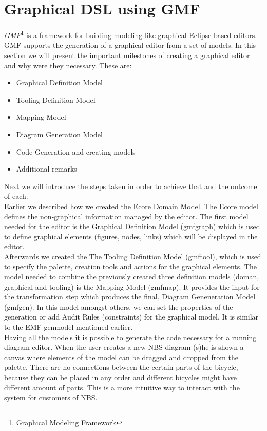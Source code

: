 \section{Graphical DSL using GMF}
\label{sec.gmf}

\noindent \emph{GMF}\footnote{Graphical Modeling Framework} is a framework for
building modeling-like graphical Eclipse-based editors.
\cite{Article_Introducing_GMF} GMF supports the generation of a graphical editor
from a set of models. In this section we will present the important
milestones of creating a graphical editor and why were they necessary. These
are:

\begin{itemize}
  \item Graphical Definition Model
  \item Tooling Definition Model
  \item Mapping Model
  \item Diagram Generation Model
  \item Code Generation and creating models
  \item Additional remarks
\end{itemize}
Next we will introduce the steps taken in order to achieve
that and the outcome of each.\\

\noindent Earlier we described how we created the Ecore Domain Model. The Ecore
model defines the non-graphical information managed by the editor. The first
model needed for the editor is the Graphical Definition Model (gmfgraph) which
is used to define graphical elements (figures, nodes, links)
which will be displayed in the editor. \\

\noindent Afterwards we created the The Tooling Definition Model (gmftool),
which is used to specify the palette, creation tools and actions for the
graphical elements. The model needed to combine the previously created three
definition models (doman, graphical and tooling) is the Mapping Model (gmfmap).
It provides the input for the transformation step which produces the final,
Diagram Geneneration Model (gmfgen). In this model amongst others, we can set
the properties of the generation or add Audit Rules (constraints) for the
graphical model. It is similar to the EMF genmodel
mentioned earlier. \cite{GMF_Tutorial} \\

\noindent Having all the models it is possible to generate the code necessary
for a running diagram editor. When the user creates a new NBS diagram (s)he is
shown a canvas where elements of the model can be dragged and dropped from the
palette. There are no connections between the certain parts
of the bicycle, because they can be placed in any order and different bicycles
might have different amount of parts. This is a more intuitive way to interact
with the system for customers of NBS.\\

